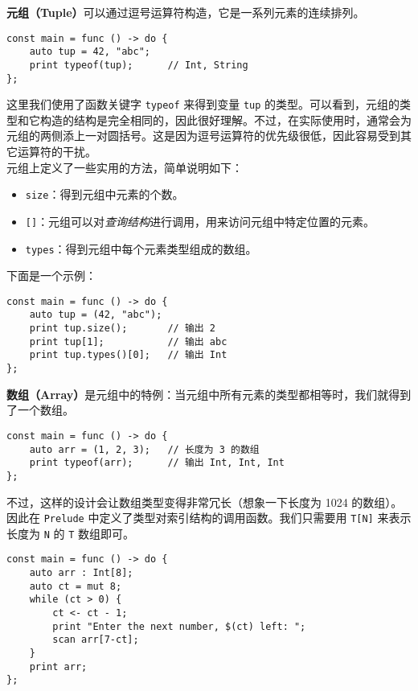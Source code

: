 \textbf{元组（Tuple）}可以通过逗号运算符构造，它是一系列元素的连续排列。

\begin{lstlisting}
const main = func () -> do {
    auto tup = 42, "abc";
    print typeof(tup);      // Int, String
};
\end{lstlisting}

这里我们使用了函数关键字 \lstinline!typeof! 来得到变量 \lstinline!tup! 的类型。可以看到，元组的类型和它构造的结构是完全相同的，因此很好理解。不过，在实际使用时，通常会为元组的两侧添上一对圆括号。这是因为逗号运算符的优先级很低，因此容易受到其它运算符的干扰。 \\

元组上定义了一些实用的方法，简单说明如下：

\begin{itemize}
    \item \lstinline!size!：得到元组中元素的个数。

    \item \lstinline![]!：元组可以对\emph{查询结构}进行调用，用来访问元组中特定位置的元素。

    \item \lstinline!types!：得到元组中每个元素类型组成的数组。
\end{itemize}

下面是一个示例：

\begin{lstlisting}
const main = func () -> do {
    auto tup = (42, "abc");
    print tup.size();       // 输出 2
    print tup[1];           // 输出 abc
    print tup.types()[0];   // 输出 Int
};
\end{lstlisting}

\textbf{数组（Array）}是元组中的特例：当元组中所有元素的类型都相等时，我们就得到了一个数组。

\begin{lstlisting}
const main = func () -> do {
    auto arr = (1, 2, 3);   // 长度为 3 的数组
    print typeof(arr);      // 输出 Int, Int, Int
};
\end{lstlisting}

不过，这样的设计会让数组类型变得非常冗长（想象一下长度为 1024 的数组）。因此在 \lstinline!Prelude! 中定义了类型对索引结构的调用函数。我们只需要用 \lstinline!T[N]! 来表示长度为 \lstinline!N! 的 \lstinline!T! 数组即可。

\begin{lstlisting}
const main = func () -> do {
    auto arr : Int[8];
    auto ct = mut 8;
    while (ct > 0) {
        ct <- ct - 1;
        print "Enter the next number, $(ct) left: ";
        scan arr[7-ct];
    }
    print arr;
};
\end{lstlisting}

